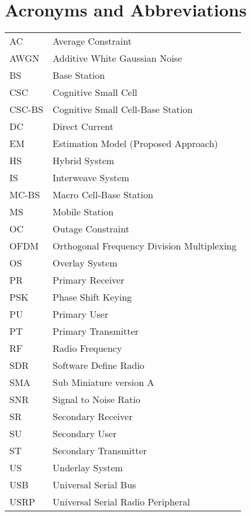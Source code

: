 
\chapter{Acronyms and Abbreviations}
\renewcommand{\arraystretch}{1.4}
\begin{longtable}{p{}p{}}
   	AC 	&	Average Constraint\\
   	AWGN	&	Additive White Gaussian Noise \\
	BS	&	Base Station \\
        CSC 	&	Cognitive Small Cell\\
	CSC-BS	&	Cognitive Small Cell-Base Station \\
	DC 	&	Direct Current \\
  	EM	&	Estimation Model (Proposed Approach) \\
	HS	& 	Hybrid System \\
	IS	& 	Interweave System \\
	MC-BS	&	Macro Cell-Base Station \\
	MS	&	Mobile Station \\
	OC	&	Outage Constraint \\
	OFDM	&	Orthogonal Frequency Division Multiplexing\\
	OS	&	Overlay System \\
	PR	& 	Primary Receiver \\
	PSK	& 	Phase Shift Keying \\
	PU	& 	Primary User \\
	PT	& 	Primary Transmitter \\
	RF	&	Radio Frequency \\
	SDR 	&	Software Define Radio \\
	SMA 	&	Sub Miniature version A\\
	SNR	&	Signal to Noise Ratio \\
	SR	& 	Secondary Receiver \\
	SU	&	Secondary User \\
	ST	& 	Secondary Transmitter \\
	US	&	Underlay System \\
	USB	&	Universal Serial Bus \\
	USRP	&	Universal Serial Radio Peripheral\\


\end{longtable}
